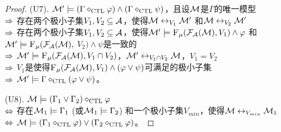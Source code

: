 \begin{proof}
	
	
	(U7). ${\cal M}' \models (\Gamma \diamond_{\textrm{CTL}} \varphi) \wedge (\Gamma \diamond_{\textrm{CTL}} \psi)$，且设${\cal M}$是$\Gamma$的唯一模型\\
	$\Rightarrow$ 存在两个极小子集$V_1, V_2 \subseteq {\cal A}$，使得${\cal M} \leftrightarrow_{V_1} {\cal M}'$ 和${\cal M} \leftrightarrow_{V_2} {\cal M}'$\\
	$\Rightarrow$ 存在两个极小子集$V_1, V_2 \subseteq {\cal A}$，使得${\cal M}' \models {\textsc{F}_{\textsc{$\mu$}}}({\cal F}_{{\cal A}}({\cal M}), V_1) \wedge \varphi$ 和 ${\cal M}' \models {\textsc{F}_{\textsc{$\mu$}}}({\cal F}_{{\cal A}}({\cal M}),$ $V_2) \wedge \psi$是一致的\\
	$\Rightarrow$ ${\cal M}' \models {\textsc{F}_{\textsc{$\mu$}}}({\cal F}_{{\cal A}}({\cal M}), V_1 \cap V_2)$，${\cal M}' \leftrightarrow_{V_1 \cap V_2} {\cal M}$，$V_1 = V_2$\\
	$\Rightarrow$  $V_1$是使得${\textsc{F}_{\textsc{$\mu$}}}({\cal F}_{{\cal A}}({\cal M}), V_1) \wedge (\varphi \vee \psi)$可满足的极小子集\\ %
	$\Rightarrow$ ${\cal M}' \models \Gamma \diamond_{\textrm{CTL}} (\varphi \vee \psi)$。
	
	
	
	(U8). ${\cal M} \models (\Gamma_1 \vee \Gamma_2) \diamond_{\textrm{CTL}} \varphi$ \\
	$\Leftrightarrow$ 存在${\cal M}_1 \models \Gamma_1$ (或${\cal M}_1 \models \Gamma_2$) 和一个极小子集$V_{min}$，使得${\cal M} \leftrightarrow_{V_{min}} {\cal M}_1$\\
	$\Leftrightarrow$ ${\cal M} \models (\Gamma_1 \diamond_{\textrm{CTL}} \varphi) \vee (\Gamma_2 \diamond_{\textrm{CTL}} \varphi)$。
\end{proof}


